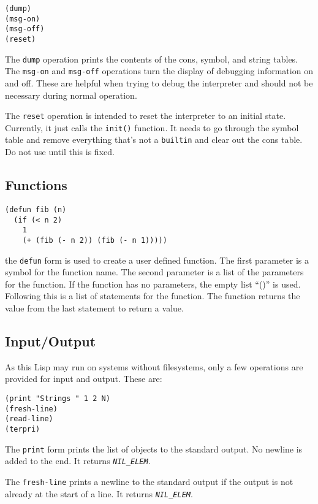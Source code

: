 \documentclass[10pt, openany]{book}
\newcommand{\function}[1]{\texttt{#1}}
\newcommand{\constant}[1]{\emph{\texttt{#1}}}
\begin{document}
\begin{lstlisting}
(dump)
(msg-on)
(msg-off)
(reset)
\end{lstlisting}

The \function{dump} operation prints the contents of the cons, symbol, and string tables.  The \function{msg-on} and \function{msg-off} operations turn the display of debugging information on and off.  These are helpful when trying to debug the interpreter and should not be necessary during normal operation.

The \function{reset} operation is intended to reset the interpreter to an initial state.  Currently, it just calls the \function{init()} function.  It needs to go through the symbol table and remove everything that's not a \function{builtin} and clear out the cons table.  Do not use until this is fixed.

\subsection{Functions}
\begin{lstlisting}
(defun fib (n)
  (if (< n 2)
    1
    (+ (fib (- n 2)) (fib (- n 1)))))
\end{lstlisting}

the \function{defun} form is used to create a user defined function.  The first parameter is a symbol for the function name.  The second parameter is a list of the parameters for the function.  If the function has no parameters, the empty list ``()'' is used.  Following this is a list of statements for the function.  The function returns the value from the last statement to return a value.\\

\subsection{Input/Output}
As this Lisp may run on systems without filesystems, only a few operations are provided for input and output.  These are:

\begin{lstlisting}
(print "Strings " 1 2 N)
(fresh-line)
(read-line)
(terpri)
\end{lstlisting}

The \function{print} form prints the list of objects to the standard output.  No newline is added to the end.  It returns \constant{NIL\_ELEM}.

The \function{fresh-line} prints a newline to the standard output if the output is not already at the start of a line.  It returns \constant{NIL\_ELEM}.
\end{document}
